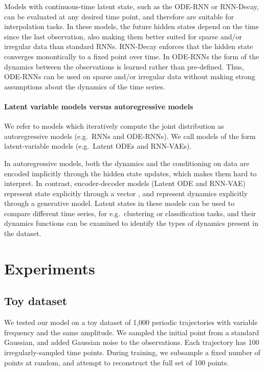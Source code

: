 \documentclass{article}
\begin{document}
Models with continuous-time latent state, such as the ODE-RNN or RNN-Decay, can be evaluated at any desired time point, and therefore are suitable for interpolation tasks.
In these models, the future hidden states depend on the time since the last observation, also making them better suited for sparse and/or irregular data than standard RNNs.
RNN-Decay enforces that the hidden state converges monontically to a fixed point over time.
In ODE-RNNs the form of the dynamics between the observations is learned rather than pre-defined.
Thus, ODE-RNNs can be used on sparse and/or irregular data without making strong assumptions about the dynamics of the time series.

\paragraph{Latent variable models versus autoregressive models}
We refer to models which iteratively compute the joint distribution  as autoregressive models (e.g.\ RNNs and ODE-RNNs).
We call models of the form  latent-variable models (e.g.\ Latent ODEs and RNN-VAEs). 

In autoregressive models, both the dynamics and the conditioning on data are encoded implicitly through the hidden state updates, which makes them hard to interpret.
In contrast, encoder-decoder models (Latent ODE and RNN-VAE) represent state explicitly through a vector , and represent dynamics explicitly through a generative model. Latent states in these models can be used to compare different time series, for e.g.\ clustering or classification tasks, and their dynamics functions can be examined to identify the types of dynamics present in the dataset.


\section{Experiments}

\subsection{Toy dataset}
We tested our model on a toy dataset of 1,000 periodic trajectories with variable frequency and the same amplitude.
We sampled the initial point from a standard Gaussian, and added Gaussian noise to the observations. 
Each trajectory has 100 irregularly-sampled time points.
During training, we subsample a fixed number of points at random, and attempt to reconstruct the full set of 100 points.
\end{document}
